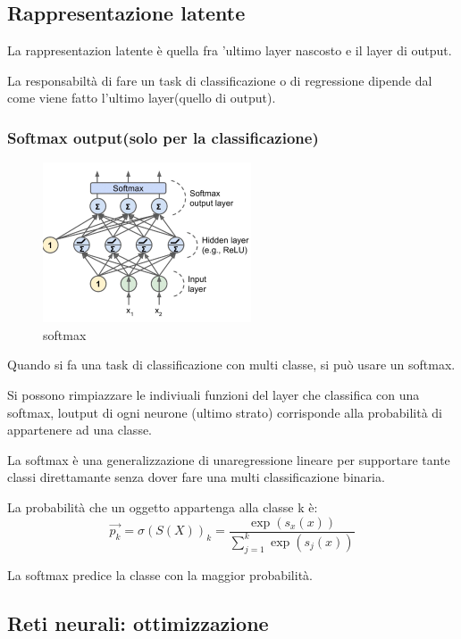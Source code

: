 \subsection{Rappresentazione latente}
La rappresentazion latente è quella fra 'ultimo layer nascosto
e il layer di output.

La responsabiltà di fare un task di classificazione o di regressione dipende dal come
viene fatto l'ultimo layer(quello di output).

\subsubsection{Softmax output(solo per la classificazione)}
\begin{figure}[H]
    \centering
    \includegraphics[width=0.5\linewidth]{imgs/softmax}
    \caption{softmax}
    \label{fig:softmax}
\end{figure}

Quando si fa una task di classificazione con multi classe, si può usare un softmax.

Si possono rimpiazzare le indiviuali funzioni del layer che classifica
con una softmax, loutput di ogni neurone (ultimo strato) corrisponde alla
probabilità di appartenere ad una classe.

La softmax è una generalizzazione di unaregressione lineare per supportare
tante classi direttamante senza dover fare una multi classificazione binaria.

La probabilità che un oggetto appartenga alla classe k è:
\begin{equation}
    \vec{p_k} = \sigma(S(X))_k =
    \frac{\exp(s_x(x))}{\sum_{j=1}^{k} \exp(s_j(x))}
\end{equation}

La softmax predice la classe con la maggior probabilità.

\subsection{Reti neurali: ottimizzazione}
